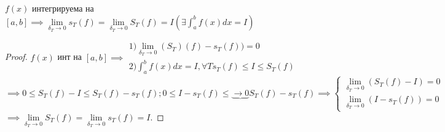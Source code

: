 \documentclass[../main.tex]{subfiles}
\begin{document}
\begin{corollary}
    $f(x)$ интегрируема на $[a,b]\implies \lim\limits_{\delta_{T}\to 0}s_{T}(f)=\lim\limits_{\delta_{T}\to 0}S_{T}(f)=I (\exists \displaystyle \int _{a}^{b}f(x)dx=I)$
\end{corollary}

\begin{proof}
    $f(x)$ инт на $[a,b]$$\implies \begin{aligned}
        1) \lim\limits_{\delta_{T}\to 0}(S_{T})(f)-s_{T}(f))=0 \\ 
        2) \int _{a}^{b}f(x)dx=I, \forall T s_{T}(f)\leqslant I\leqslant S_{T}(f) 
    \end{aligned}$$\implies 0\leqslant S_{T}(f)-I\leqslant S_{T}(f)-s_{T}(f); 0\leqslant I-s_{T}(f)\leqslant \underbrace{\to 0}{S_{T}(f)-s_{T}(f)}
    \implies \begin{cases}
        \lim\limits_{\delta_{T}\to 0}(S_{T}(f)-I)=0 \\ 
        \lim\limits_{\delta_{T}\to 0}(I-s_{T}(f))=0 
    \end{cases} $$\implies \lim\limits_{\delta_{T}\to 0}S_{T}(f)=\lim\limits_{\delta_{T}\to 0}s_{T}(f)=I$.
\end{proof}
\end{document}
